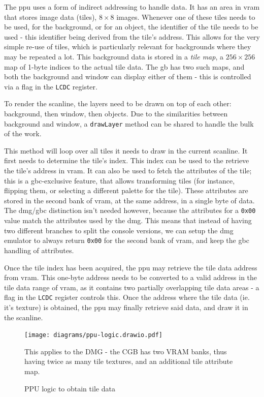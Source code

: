 \documentclass[11pt]{informatics-report}
\begin{document}
The \gls{ppu} uses a form of indirect addressing to handle data. It has an area in \gls{vram} that stores image data (tiles), $8 \times 8$ images. Whenever one of these tiles needs to be used, for the background, or for an object, the identifier of the tile needs to be used - this identifier being derived from the tile's address. This allows for the very simple re-use of tiles, which is particularly relevant for backgrounds where they may be repeated a lot. This background data is stored in a \textit{tile map}, a $256 \times 256$ map of 1-byte indices to the actual tile data. The \gls{gb} has two such maps, and both the background and window can display either of them - this is controlled via a flag in the \texttt{LCDC} register.

To render the scanline, the layers need to be drawn on top of each other: background, then window, then objects. Due to the similarities between background and window, a \texttt{drawLayer} method can be shared to handle the bulk of the work.

This method will loop over all tiles it needs to draw in the current scanline. It first needs to determine the tile's index. This index can be used to the retrieve the tile's address in \gls{vram}. It can also be used to fetch the attributes of the tile; this is a \gls{gbc}-exclusive feature, that allows transforming tiles (for instance, flipping them, or selecting a different palette for the tile). These attributes are stored in the second bank of \gls{vram}, at the same address, in a single byte of data. The \gls{dmg}/\gls{gbc} distinction isn't needed however, because the attributes for a \texttt{0x00} value match the attributes used by the \gls{dmg}. This means that instead of having two different branches to split the console versions, we can setup the \gls{dmg} emulator to always return \texttt{0x00} for the second bank of \gls{vram}, and keep the \gls{gbc} handling of attributes.

Once the tile index has been acquired, the \gls{ppu} may retrieve the tile data address from \gls{vram}. This one-byte address needs to be converted to a valid address in the tile data range of \gls{vram}, as it contains two partially overlapping tile data areas - a flag in the \texttt{LCDC} register controls this. Once the address where the tile data (ie. it's texture) is obtained, the \gls{ppu} may finally retrieve said data, and draw it in the scanline.

\begin{figure}[h]
    \centering
    \texttt{[image: diagrams/ppu-logic.drawio.pdf]}
    \caption{PPU logic to obtain tile data}
	This applies to the DMG - the CGB has two VRAM banks, thus having twice as many tile textures, and an additional tile attribute map.
    \label{fig:emu-core-components}
\end{figure}
\end{document}
